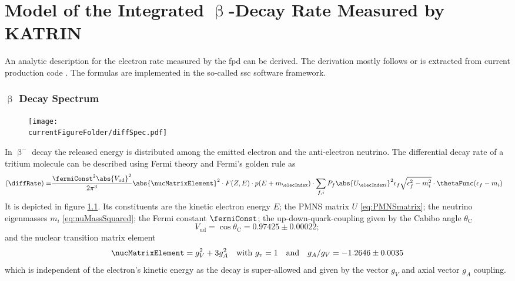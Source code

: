 \def\currentRootFolder{chapter/modelOfIntegratedRate}
\def\currentFigureFolder{\currentRootFolder/fig}


\chapter{Model of the Integrated \texorpdfstring{$\upbeta$}{Beta}-Decay Rate Measured by KATRIN}
\label{sec:katrinExpIntSpecModel}
An analytic description for the electron rate measured by the \gls{fpd} can be derived. The derivation mostly follows \cite{Kleesiek2019, Groh2015, Kleesiek2014} or is extracted from current production code \cite{KATRINCOL2019}. The formulas are implemented in the so-called \gls{ssc} software framework.

\subsection{\texorpdfstring{$\upbeta$}{Beta} Decay Spectrum}
\begin{figure}
    \centering
    \texttt{[image: \\currentFigureFolder/diffSpec.pdf]}
    \label{fig:diffSpec}
\end{figure}
\label{sec:diffSpec}
In $\upbeta^-$ decay the released energy is distributed among the emitted electron and the anti-electron neutrino. The differential decay rate of a tritium molecule can be described using Fermi theory and Fermi's golden rule as
\begin{align}
    \label{eq:diffRate}
    \left(\diffRate\right) = &
    \frac{\fermiConst^2 \abs{V_\mathrm{ud}}^2}{2 \pi^3}
    \abs{\nucMatrixElement}^2 \cdot
    F(Z, E) \cdot 
    p(E+m_\elecIndex) \cdot 
    \sum_{f,i} P_f \abs{U_{\elecIndex i}}^2 \epsilon_f \sqrt{\epsilon_f^2-m_i^2} \cdot \thetaFunc(\epsilon_f-m_i)
\end{align}
It is depicted in figure \ref{fig:diffSpec}. Its constituents are the kinetic electron energy $E$;
the PMNS matrix $U$ \eqref{eq:PMNSmatrix}; the neutrino eigenmasses $m_i$ \eqref{eq:nuMassSquared};
the Fermi constant $\fermiConst$;
the up-down-quark-coupling given by the Cabibo angle $\theta_\mathrm{C}$
\begin{equation}
    V_\mathrm{ud} = \cos \theta_\mathrm{C} = 
    0.97425\pm0.00022;
\end{equation}
and the nuclear transition matrix element
\begin{equation}
    \nucMatrixElement = g_V^2+3g_A^2 \quad
    \text{with } g_v = 1 \quad
    \text{and} \quad g_A/g_V = -1.2646 \pm 0.0035
\end{equation}
which is independent of the electron's kinetic energy as the decay is super-allowed and given by the vector $g_V$ and axial vector $g_A$ coupling.

